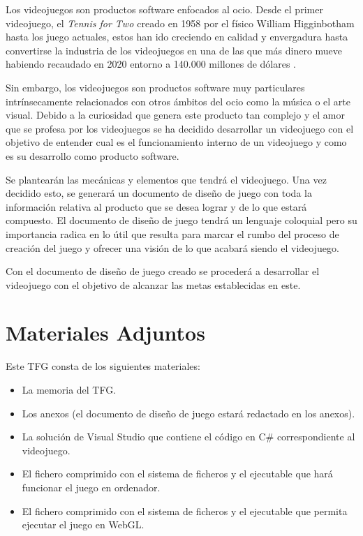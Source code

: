 
Los videojuegos son productos software enfocados al ocio. Desde el primer videojuego, el \textit{Tennis for Two \cite{Tennis4two}} creado en 1958 por el físico William Higginbotham hasta los juego actuales, estos han ido creciendo en calidad y envergadura hasta convertirse la industria de los videojuegos en una de las que más dinero mueve habiendo recaudado en 2020 entorno a 140.000 millones de dólares \cite{2020GamesMoney}.

Sin embargo, los videojuegos son productos software muy particulares intrínsecamente relacionados con otros ámbitos del ocio como la música o el arte visual. Debido a la curiosidad que genera este producto tan complejo y el amor que se profesa por los videojuegos se ha decidido desarrollar un videojuego con el objetivo de entender cual es el funcionamiento interno de un videojuego y como es su desarrollo como producto software.

Se plantearán las mecánicas y elementos que tendrá el videojuego. Una vez decidido esto, se generará un documento de diseño de juego con toda la información relativa al producto que se desea lograr y de lo que estará compuesto. El documento de diseño de juego tendrá un lenguaje coloquial pero su importancia radica en lo útil que resulta para marcar el rumbo del proceso de creación del juego y ofrecer una visión de lo que acabará siendo el videojuego.

Con el documento de diseño de juego creado se procederá a desarrollar el videojuego con el objetivo de alcanzar las metas establecidas en este.

\section{Materiales Adjuntos}
Este TFG consta de los siguientes materiales:
\begin{itemize}
\item
La memoria del TFG.
\item
Los anexos (el documento de diseño de juego estará redactado en los anexos).
\item
La solución de Visual Studio que contiene el código en C\# correspondiente al videojuego.
\item
El fichero comprimido con el sistema de ficheros y el ejecutable que hará funcionar el juego en ordenador.
\item
El fichero comprimido con el sistema de ficheros y el ejecutable que permita ejecutar el juego en WebGL.
\end{itemize}

